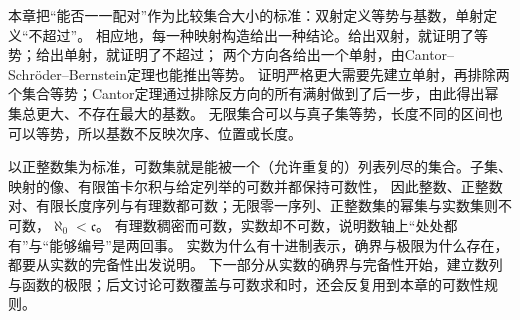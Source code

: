 本章把“能否一一配对”作为比较集合大小的标准：双射定义等势与基数，单射定义“不超过”。
相应地，每一种映射构造给出一种结论。给出双射，就证明了等势；给出单射，就证明了不超过；
两个方向各给出一个单射，由Cantor--Schröder--Bernstein定理也能推出等势。
证明严格更大需要先建立单射，再排除两个集合等势；Cantor定理通过排除反方向的所有满射做到了后一步，由此得出幂集总更大、不存在最大的基数。
无限集合可以与真子集等势，长度不同的区间也可以等势，所以基数不反映次序、位置或长度。

以正整数集为标准，可数集就是能被一个（允许重复的）列表列尽的集合。子集、映射的像、有限笛卡尔积与给定列举的可数并都保持可数性，
因此整数、正整数对、有限长度序列与有理数都可数；无限零一序列、正整数集的幂集与实数集则不可数，$\aleph_0<\mathfrak c$。
有理数稠密而可数，实数却不可数，说明数轴上“处处都有”与“能够编号”是两回事。
实数为什么有十进制表示，确界与极限为什么存在，都要从实数的完备性出发说明。
下一部分从实数的确界与完备性开始，建立数列与函数的极限；后文讨论可数覆盖与可数求和时，还会反复用到本章的可数性规则。
